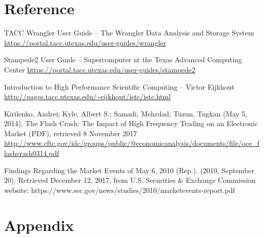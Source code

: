 \documentclass[12pt]{article} %
\begin{document}

\newpage

\section{Reference}

\begin{flushleft}

TACC Wrangler User Guide  -- The Wrangler Data Analysis and Storage System \url{https://portal.tacc.utexas.edu/user-guides/wrangler}

Stampede2 User Guide -- Supercomputer at the Texas Advanced Computing Center \url{https://portal.tacc.utexas.edu/user-guides/stampede2}

Introduction to High Performance Scientific Computing -- Victor Eijkhout \\ \url{http://pages.tacc.utexas.edu/~eijkhout/istc/istc.html}

Kirilenko, Andrei; Kyle, Albert S.; Samadi, Mehrdad; Tuzun, Tugkan (May 5, 2014), The Flash Crash: The Impact of High Frequency Trading on an Electronic Market (PDF), retrieved 8 November 2017 \\ \url{http://www.cftc.gov/idc/groups/public/@economicanalysis/documents/file/oce_flashcrash0314.pdf}

Findings Regarding the Market Events of May 6, 2010 (Rep.). (2010, September 20). Retrieved December 12, 2017, from U.S. Securities \& Exchange Commission website: https://www.sec.gov/news/studies/2010/marketevents-report.pdf

\end{flushleft}


\section{Appendix}
\end{document}
